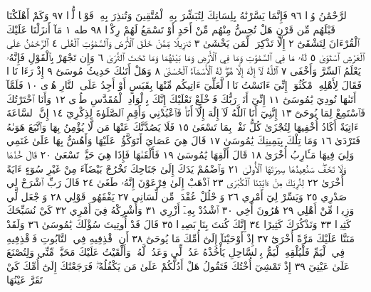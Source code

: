 ٱلرَّحْمَٰنُ وُدࣰّا ٩٦ فَإِنَّمَا يَسَّرْنَٰهُ بِلِسَانِكَ لِتُبَشِّرَ بِهِ
ٱلْمُتَّقِينَ وَتُنذِرَ بِهِۦ قَوْمࣰا لُّدࣰّا ٩٧ وَكَمْ أَهْلَكْنَا قَبْلَهُم
مِّن قَرْنٍ هَلْ تُحِسُّ مِنْهُم مِّنْ أَحَدٍ أَوْ تَسْمَعُ لَهُمْ رِكْزَۢا ٩٨
طه ١ مَآ أَنزَلْنَا عَلَيْكَ ٱلْقُرْءَانَ لِتَشْقَىٰٓ ٢ إِلَّا تَذْكِرَةࣰ
لِّمَن يَخْشَىٰ ٣ تَنزِيلࣰا مِّمَّنْ خَلَقَ ٱلْأَرْضَ وَٱلسَّمَٰوَٰتِ ٱلْعُلَى ٤
ٱلرَّحْمَٰنُ عَلَى ٱلْعَرْشِ ٱسْتَوَىٰ ٥ لَهُۥ مَا فِي ٱلسَّمَٰوَٰتِ وَمَا فِي
ٱلْأَرْضِ وَمَا بَيْنَهُمَا وَمَا تَحْتَ ٱلثَّرَىٰ ٦ وَإِن تَجْهَرْ بِٱلْقَوْلِ
فَإِنَّهُۥ يَعْلَمُ ٱلسِّرَّ وَأَخْفَى ٧ ٱللَّهُ لَآ إِلَٰهَ إِلَّا هُوَۖ لَهُ ٱلْأَسْمَآءُ
ٱلْحُسْنَىٰ ٨ وَهَلْ أَتَىٰكَ حَدِيثُ مُوسَىٰٓ ٩ إِذْ رَءَا نَارࣰا
فَقَالَ لِأَهْلِهِ ٱمْكُثُوٓا۟ إِنِّيٓ ءَانَسْتُ نَارࣰا لَّعَلِّيٓ ءَاتِيكُم مِّنْهَا بِقَبَسٍ
أَوْ أَجِدُ عَلَى ٱلنَّارِ هُدࣰى ١٠ فَلَمَّآ أَتَىٰهَا نُودِيَ يَٰمُوسَىٰٓ ١١ إِنِّيٓ
أَنَا۠ رَبُّكَ فَٱخْلَعْ نَعْلَيْكَ إِنَّكَ بِٱلْوَادِ ٱلْمُقَدَّسِ طُوࣰى ١٢
وَأَنَا ٱخْتَرْتُكَ فَٱسْتَمِعْ لِمَا يُوحَىٰٓ ١٣ إِنَّنِيٓ أَنَا ٱللَّهُ لَآ إِلَٰهَ إِلَّآ أَنَا۠
فَٱعْبُدْنِي وَأَقِمِ ٱلصَّلَوٰةَ لِذِكْرِيٓ ١٤ إِنَّ ٱلسَّاعَةَ ءَاتِيَةٌ
أَكَادُ أُخْفِيهَا لِتُجْزَىٰ كُلُّ نَفْسِۭ بِمَا تَسْعَىٰ ١٥ فَلَا يَصُدَّنَّكَ
عَنْهَا مَن لَّا يُؤْمِنُ بِهَا وَٱتَّبَعَ هَوَىٰهُ فَتَرْدَىٰ ١٦ وَمَا تِلْكَ
بِيَمِينِكَ يَٰمُوسَىٰ ١٧ قَالَ هِيَ عَصَايَ أَتَوَكَّؤُا۟ عَلَيْهَا
وَأَهُشُّ بِهَا عَلَىٰ غَنَمِي وَلِيَ فِيهَا مَـَٔارِبُ أُخْرَىٰ ١٨ قَالَ أَلْقِهَا
يَٰمُوسَىٰ ١٩ فَأَلْقَىٰهَا فَإِذَا هِيَ حَيَّةࣱ تَسْعَىٰ ٢٠ قَالَ خُذْهَا
وَلَا تَخَفْۖ سَنُعِيدُهَا سِيرَتَهَا ٱلْأُولَىٰ ٢١ وَٱضْمُمْ يَدَكَ
إِلَىٰ جَنَاحِكَ تَخْرُجْ بَيْضَآءَ مِنْ غَيْرِ سُوٓءٍ ءَايَةً أُخْرَىٰ ٢٢ لِنُرِيَكَ
مِنْ ءَايَٰتِنَا ٱلْكُبْرَى ٢٣ ٱذْهَبْ إِلَىٰ فِرْعَوْنَ إِنَّهُۥ طَغَىٰ ٢٤ قَالَ
رَبِّ ٱشْرَحْ لِي صَدْرِي ٢٥ وَيَسِّرْ لِيٓ أَمْرِي ٢٦ وَٱحْلُلْ عُقْدَةࣰ مِّن
لِّسَانِي ٢٧ يَفْقَهُوا۟ قَوْلِي ٢٨ وَٱجْعَل لِّي وَزِيرࣰا مِّنْ أَهْلِي ٢٩ هَٰرُونَ
أَخِي ٣٠ ٱشْدُدْ بِهِۦٓ أَزْرِي ٣١ وَأَشْرِكْهُ فِيٓ أَمْرِي ٣٢ كَيْ نُسَبِّحَكَ
كَثِيرࣰا ٣٣ وَنَذْكُرَكَ كَثِيرًا ٣٤ إِنَّكَ كُنتَ بِنَا بَصِيرࣰا ٣٥ قَالَ قَدْ
أُوتِيتَ سُؤْلَكَ يَٰمُوسَىٰ ٣٦ وَلَقَدْ مَنَنَّا عَلَيْكَ مَرَّةً أُخْرَىٰٓ ٣٧
إِذْ أَوْحَيْنَآ إِلَىٰٓ أُمِّكَ مَا يُوحَىٰٓ ٣٨ أَنِ ٱقْذِفِيهِ فِي ٱلتَّابُوتِ فَٱقْذِفِيهِ
فِي ٱلْيَمِّ فَلْيُلْقِهِ ٱلْيَمُّ بِٱلسَّاحِلِ يَأْخُذْهُ عَدُوࣱّ لِّي وَعَدُوࣱّ لَّهُۥۚ وَأَلْقَيْتُ
عَلَيْكَ مَحَبَّةࣰ مِّنِّي وَلِتُصْنَعَ عَلَىٰ عَيْنِيٓ ٣٩ إِذْ تَمْشِيٓ أُخْتُكَ فَتَقُولُ
هَلْ أَدُلُّكُمْ عَلَىٰ مَن يَكْفُلُهُۥۖ فَرَجَعْنَٰكَ إِلَىٰٓ أُمِّكَ كَيْ تَقَرَّ عَيْنُهَا
